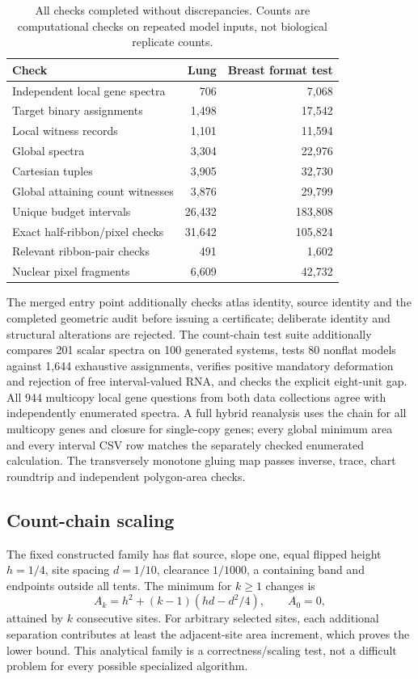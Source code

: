 \documentclass[10pt,letterpaper]{article}
\begin{document}
\begin{table}[ht]\centering
\begin{tabular}{lrr}\toprule
Check&Lung&Breast format test\\\midrule
Independent local gene spectra&706&7,068\\
Target binary assignments&1,498&17,542\\
Local witness records&1,101&11,594\\
Global spectra&3,304&22,976\\
Cartesian tuples&3,905&32,730\\
Global attaining count witnesses&3,876&29,799\\
Unique budget intervals&26,432&183,808\\
Exact half-ribbon/pixel checks&31,642&105,824\\
Relevant ribbon-pair checks&491&1,602\\
Nuclear pixel fragments&6,609&42,732\\\bottomrule
\end{tabular}
\caption{All checks completed without discrepancies. Counts are computational checks on repeated model inputs, not biological replicate counts.}
\end{table}

The merged entry point additionally checks atlas identity, source identity and the completed geometric audit before issuing a certificate; deliberate identity and structural alterations are rejected. The count-chain test suite additionally compares 201 scalar spectra on 100 generated systems, tests 80 nonflat models against 1,644 exhaustive assignments, verifies positive mandatory deformation and rejection of free interval-valued RNA, and checks the explicit eight-unit gap. All 944 multicopy local gene questions from both data collections agree with independently enumerated spectra. A full hybrid reanalysis uses the chain for all multicopy genes and closure for single-copy genes; every global minimum area and every interval CSV row matches the separately checked enumerated calculation. The transversely monotone gluing map passes inverse, trace, chart roundtrip and independent polygon-area checks.

\subsection{Count-chain scaling}
The fixed constructed family has flat source, slope one, equal flipped height $h=1/4$, site spacing $d=1/10$, clearance $1/1000$, a containing band and endpoints outside all tents. The minimum for $k\ge1$ changes is
\[
 A_k=h^2+(k-1)(hd-d^2/4),\qquad A_0=0,
\]
attained by $k$ consecutive sites. For arbitrary selected sites, each additional separation contributes at least the adjacent-site area increment, which proves the lower bound. This analytical family is a correctness/scaling test, not a difficult problem for every possible specialized algorithm.
\end{document}
